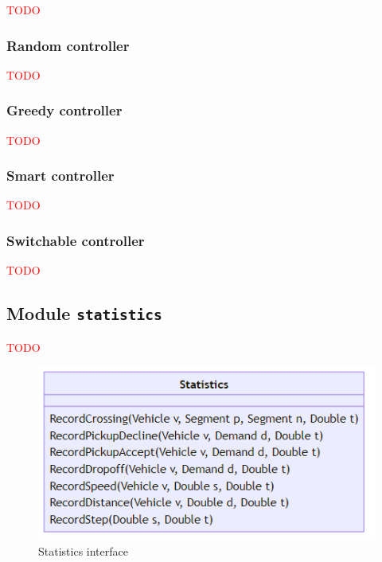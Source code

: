 \documentclass[10pt,twocolumn]{article}
\begin{document}
\textcolor{red}{TODO}

\subsubsection{Random controller}
\label{sec:controller-random}

\textcolor{red}{TODO}

\subsubsection{Greedy controller}
\label{sec:controller-greedy}

\textcolor{red}{TODO}

\subsubsection{Smart controller}
\label{sec:controller-smart}

\textcolor{red}{TODO}

\subsubsection{Switchable controller}
\label{sec:controller-switch}

\textcolor{red}{TODO}

\subsection{Module \texttt{statistics}}
\label{sec:statistics-interface}

\textcolor{red}{TODO}

\begin{figure}[h!]
    \centering
    \includegraphics[scale=0.4]{../../diagrams/statistics/classes.png}
    \caption{Statistics interface}
    \label{fig:statistics-interface}
\end{figure}
\end{document}
